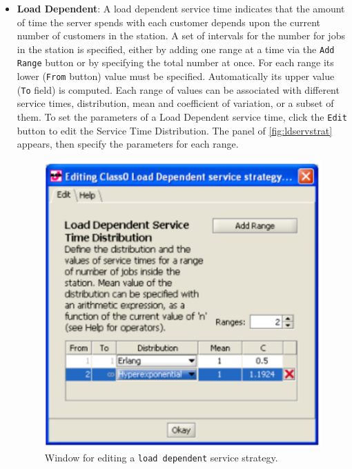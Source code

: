 \begin{itemize}
\item \textbf{Load Dependent}: A load dependent service time
indicates that the amount of time the server spends with each
customer depends upon the current number of customers in the
station. A set of intervals for the number for jobs in the station
is specified, either by adding one range at a time via the
\texttt{Add Range} button or by specifying the total number at
once. For each range its lower (\texttt{From} button) value must
be specified. Automatically its upper value (\texttt{To} field) is
computed. Each range of values can be associated with different
service times, distribution, mean and coefficient of variation, or
a subset of them. To set the parameters of a Load Dependent
service time, click the \texttt{Edit} button to edit the Service
Time Distribution. The panel of \autoref{fig:ldservstrat}
appears, then specify the parameters for each range.\\
\begin{figure}[htb]
    \begin{center}
        \includegraphics[scale=.5]{img/jsimg/8.18.eps}
    \end{center}
    \caption{Window for editing a \texttt{load dependent} service strategy.}
    \label{fig:ldservstrat}
\end{figure}

\end{itemize}
